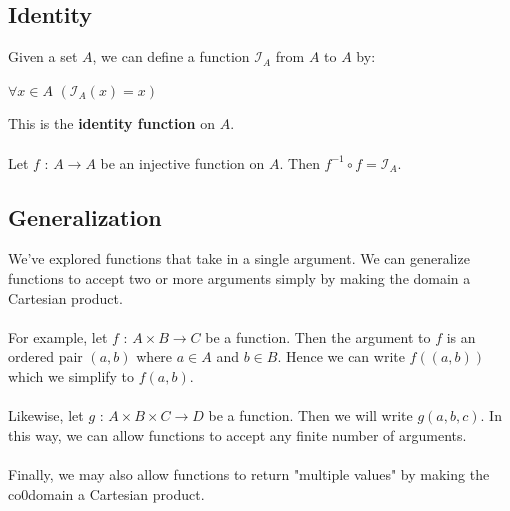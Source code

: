 \documentclass[a4paper]{article}
\begin{document}
\subsection{Identity}
Given a set $A$, we can define a function $\mathcal{I}_A$ from $A$ to $A$ by:
\begin{center}
	$\forall x \in A$ $(\mathcal{I}_A(x) = x)$
\end{center}
This is the \textbf{identity function} on $A$.\\ \\
Let $f$ : $A \rightarrow A$ be an injective function on $A$. Then $f^{-1} \circ f = \mathcal{I}_A$.

\subsection{Generalization}
We've explored functions that take in a single argument. We can generalize functions to accept two or more arguments simply by making the domain a Cartesian product.\\ \\
For example, let $f$ : $A \times B \rightarrow C$ be a function. Then the argument to $f$ is an ordered pair $(a,b)$ where $a \in A$ and $b \in B$. Hence we can write $f((a,b))$ which we simplify to $f(a,b)$.\\ \\
Likewise, let $g$ : $A \times B \times C \rightarrow D$ be a function. Then we will write $g(a,b,c)$. In this way, we can allow functions to accept any finite number of arguments.\\ \\
Finally, we may also allow functions to return "multiple values" by making the co0domain a Cartesian product.
\end{document}
